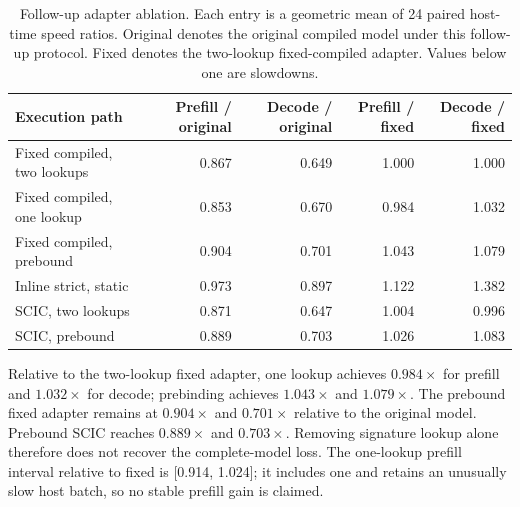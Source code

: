 \begin{table}[t]

\centering\small

\caption{Follow-up adapter ablation. Each entry is a geometric mean of 24 paired host-time speed ratios. Original denotes the original compiled model under this follow-up protocol. Fixed denotes the two-lookup fixed-compiled adapter. Values below one are slowdowns.}

\label{tab:adapter-ablation}

\begin{tabular}{@{}lrrrr@{}}

\toprule

Execution path & Prefill / original & Decode / original & Prefill / fixed & Decode / fixed \\

\midrule

Fixed compiled, two lookups & 0.867 & 0.649 & 1.000 & 1.000 \\

Fixed compiled, one lookup & 0.853 & 0.670 & 0.984 & 1.032 \\

Fixed compiled, prebound & 0.904 & 0.701 & 1.043 & 1.079 \\

Inline strict, static & 0.973 & 0.897 & 1.122 & 1.382 \\

SCIC, two lookups & 0.871 & 0.647 & 1.004 & 0.996 \\

SCIC, prebound & 0.889 & 0.703 & 1.026 & 1.083 \\

\bottomrule

\end{tabular}

\end{table}

Relative to the two-lookup fixed adapter, one lookup achieves $0.984\times$ for prefill and $1.032\times$ for decode; prebinding achieves $1.043\times$ and $1.079\times$. The prebound fixed adapter remains at $0.904\times$ and $0.701\times$ relative to the original model. Prebound SCIC reaches $0.889\times$ and $0.703\times$. Removing signature lookup alone therefore does not recover the complete-model loss. The one-lookup prefill interval relative to fixed is [0.914, 1.024]; it includes one and retains an unusually slow host batch, so no stable prefill gain is claimed.

